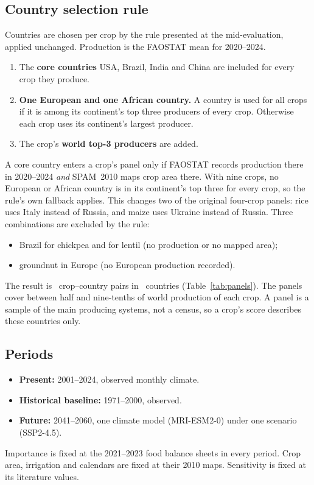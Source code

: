 \subsection{Country selection rule}\label{sec:panelrule}
Countries are chosen per crop by the rule presented at the mid-evaluation, applied unchanged. Production is the
FAOSTAT mean for 2020--2024.
\begin{enumerate}
\item The \textbf{core countries} USA, Brazil, India and China are included for every crop they produce.
\item \textbf{One European and one African country.} A country is used for all crops if it is among its
continent's top three producers of every crop. Otherwise each crop uses its continent's largest producer.
\item The crop's \textbf{world top-3 producers} are added.
\end{enumerate}
A core country enters a crop's panel only if FAOSTAT records production there in 2020--2024 \emph{and} SPAM~2010
maps crop area there. With nine crops, no European or African country is in its continent's top three for every
crop, so the rule's own fallback applies. This changes two of the original four-crop panels: rice uses Italy
instead of Russia, and maize uses Ukraine instead of Russia. Three combinations are excluded by the rule:
\begin{itemize}
\item Brazil for chickpea and for lentil (no production or no mapped area);
\item groundnut in Europe (no European production recorded).
\end{itemize}
The result is \nPairs\ crop--country pairs in \nCountries\ countries (Table~\ref{tab:panels}). The panels cover
between half and nine-tenths of world production of each crop. A panel is a sample of the main producing
systems, not a census, so a crop's score describes these countries only.

\begin{table}[H]\centering\small
\caption{Country panels (FAOSTAT production 2020--24; world rank order; $*$ = less than 0.5\% of world output).}\label{tab:panels}
\end{table}

\subsection{Periods}
\begin{itemize}
\item \textbf{Present:} 2001--2024, observed monthly climate.
\item \textbf{Historical baseline:} 1971--2000, observed.
\item \textbf{Future:} 2041--2060, one climate model (MRI-ESM2-0) under one scenario (SSP2-4.5).
\end{itemize}
Importance is fixed at the 2021--2023 food balance sheets in every period. Crop area, irrigation and calendars are
fixed at their 2010 maps. Sensitivity is fixed at its literature values.

